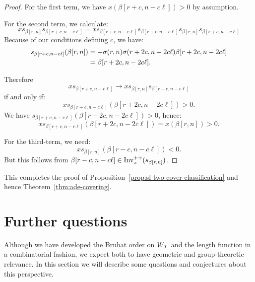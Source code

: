 \documentclass[10pt]{amsart}
\begin{document}
\begin{proof}
For the first term, we have $x(\beta[r+c, n- c\ell]) > 0$ by assumption.

For the second term, we calculate:
\begin{equation}\label{eq:84}
x s_{\beta[r,n]} s_{\beta[r+c, n- c\ell]} = x s_{\beta[r+c, n- c\ell]} s_{\beta[r+c, n- c\ell]} s_{\beta[r,n]} s_{\beta[r+c, n- c\ell]}
\end{equation}
Because of our conditions defining $c$, we have:
\begin{align}\label{eq:87}
s_{\beta[r+c, n- c\ell]}(\beta[r,n]) &= - \sigma(r,n) \sigma(r+2c,n-2c \ell) \beta[r+2c,n-2c \ell]\\\notag &= \beta[r+2c,n-2c \ell].
\end{align}

Therefore
\begin{equation}\label{eq:88}
x s_{\beta[r+c, n- c\ell]} \rightarrow x s_{\beta[r,n]} s_{\beta[r-c, n- c\ell]}
\end{equation}
if and only if:
\begin{equation}\label{eq:89}
x s_{\beta[r+c,n-c\ell]}(\beta[r+2c,n-2c \ell]) > 0.
\end{equation}
We have $ s_{\beta[r+c,n-c\ell]}(\beta[r+2c,n-2c \ell]) > 0$, hence:
\begin{equation}\label{eq:90}
x s_{\beta[r+c,n-c\ell]}(\beta[r+2c,n-2c \ell]) = x(\beta[r,n]) > 0.
\end{equation}

For the third-term, we need:
\begin{equation}\label{eq:91}
x s_{\beta[r,n]} (\beta[r-c, n- c\ell]) < 0.
\end{equation}
But this follows from $\beta[r-c,n-c\ell] \in \operatorname{Inv}^{++}_x(s_{\beta[r,n]})$.
\end{proof}

This completes the proof of Proposition~\ref{prop:sl-two-cover-classification} and hence Theorem~\ref{thm:ade-covering}.


\section{Further questions}\label{sec:further-questions}

Although we have developed the Bruhat order on $W_{\mathcal{T}}$ and the length function in a combinatorial fashion, we expect both to have geometric and group-theoretic relevance. In this section we will describe some questions and conjectures about this perspective.
\end{document}

